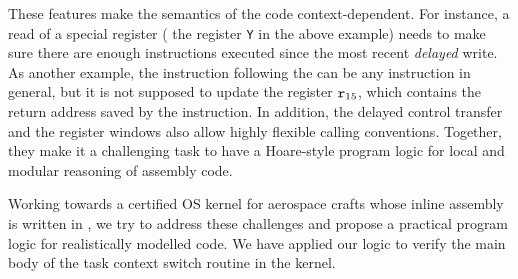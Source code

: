 These features make the semantics of the \sparc{} code
context-dependent. For instance, a read of a special register
(\eg{} the register {\tt Y} in the above example) needs to
make sure there are enough instructions executed since the
most recent {\em delayed} write. As another example,
the instruction following the \call{} can be any
instruction in general, but it is not supposed to
update the register $\texttt{r}_{15}$, which contains the return
address saved by the \call{} instruction.
In addition,
the delayed control transfer
and the register windows also allow highly flexible calling
conventions. Together, they make it a challenging task
to have a Hoare-style program logic for local and modular
reasoning of \sparc{} assembly code.

Working towards a certified OS kernel for aerospace
crafts whose inline assembly is written in \sparc,
we try to address these challenges and propose a practical
program logic for realistically modelled \sparc{} code.
We have applied our logic to verify the main body of
the task context switch routine in the kernel.

